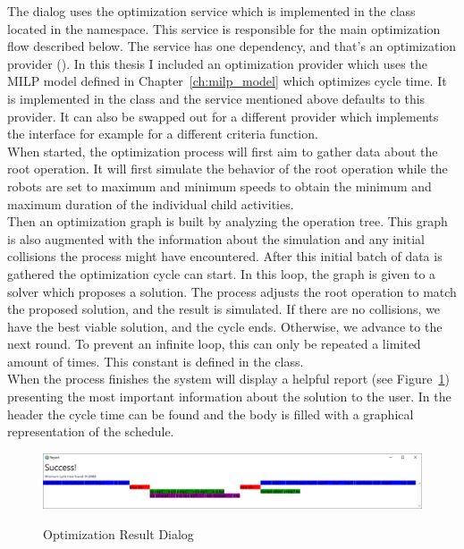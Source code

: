 The dialog uses the optimization service which is implemented in the  class located in the  namespace. 
This service is responsible for the main optimization flow described below. 
The service has one dependency, and that's an optimization provider (). 
In this thesis I included an optimization provider which uses the MILP model defined in Chapter~\ref{ch:milp_model} which optimizes cycle time. 
It is implemented in the  class and the service mentioned above defaults to this provider. 
It can also be swapped out for a different provider which implements the  interface for example for a different criteria function. \\

When started, the optimization process will first aim to gather data about the root operation. It will first simulate the behavior of the root operation while the robots are set to maximum and minimum speeds to obtain the minimum and maximum duration of the individual child activities.\\

Then an optimization graph is built by analyzing the operation tree. This graph is also augmented with the information about the simulation and any initial collisions the process might have encountered. After this initial batch of data is gathered the optimization cycle can start. In this loop, the graph is given to a solver which proposes a solution. The process adjusts the root operation to match the proposed solution, and the result is simulated. If there are no collisions, we have the best viable solution, and the cycle ends. Otherwise, we advance to the next round. To prevent an infinite loop, this can only be repeated a limited amount of times. 
This constant is defined in the  class. \\

When the process finishes the system will display a helpful report (see Figure~\ref{fig:DialogOptimizationResult}) presenting the most important information about the solution to the user. In the header the cycle time can be found and the body is filled with a graphical representation of the schedule.  

\begin{figure}[H]
	\caption{Optimization Result Dialog}
	\centering
	\includegraphics[width=\textwidth]{dialog_optimizationresult}
	\label{fig:DialogOptimizationResult}
\end{figure}


